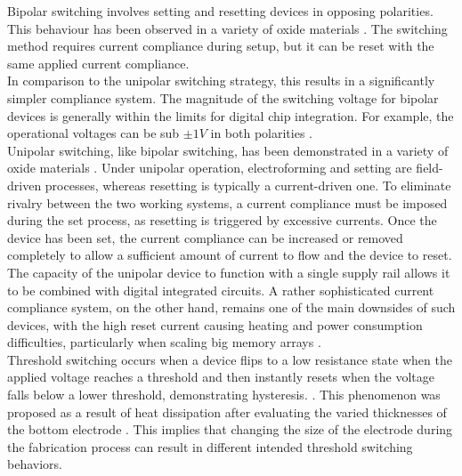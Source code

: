 \noindent Bipolar switching involves setting and resetting devices in opposing polarities. This behaviour has been observed in a variety of oxide materials \cite{wei2008highly}. The switching method requires current compliance during setup, but it can be reset with the same applied current compliance. \\

\noindent In comparison to the unipolar switching strategy, this results in a significantly simpler compliance system. The magnitude of the switching voltage for bipolar devices is generally within the limits for digital chip integration. For example, the operational voltages can be sub $\pm 1V$ in both polarities \cite{menke2009separation}. \\

\noindent Unipolar switching, like bipolar switching, has been demonstrated in a variety of oxide materials \cite{jeong2007coexistence}. Under unipolar operation, electroforming and setting are field-driven processes, whereas resetting is typically a current-driven one. To eliminate rivalry between the two working systems, a current compliance must be imposed during the set process, as resetting is triggered by excessive currents. Once the device has been set, the current compliance can be increased or removed completely to allow a sufficient amount of current to flow and the device to reset. \\

\noindent The capacity of the unipolar device to function with a single supply rail allows it to be combined with digital integrated circuits. A rather sophisticated current compliance system, on the other hand, remains one of the main downsides of such devices, with the high reset current causing heating and power consumption difficulties, particularly when scaling big memory arrays \cite{yun2007random}. \\

\noindent Threshold switching occurs when a device flips to a low resistance state when the applied voltage reaches a threshold and then instantly resets when the voltage falls below a lower threshold, demonstrating hysteresis. \cite{adler1980threshold}. This phenomenon was proposed as a result of heat dissipation after evaluating the varied thicknesses of the bottom electrode \cite{chang2008effects}. This implies that changing the size of the electrode during the fabrication process can result in different intended threshold switching behaviors. \\

